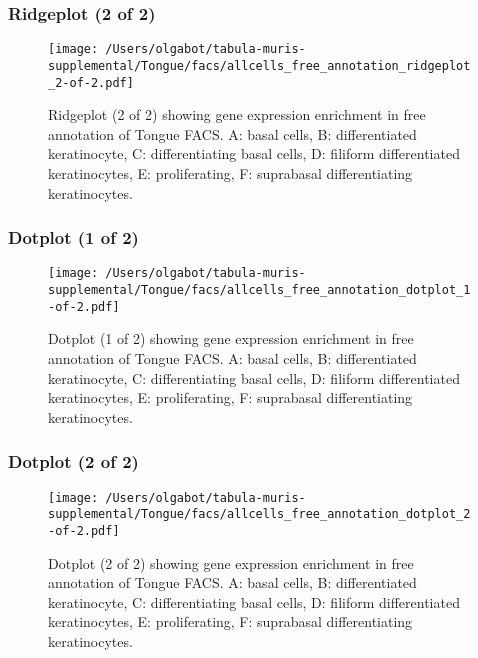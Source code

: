\clearpage
\clearpage
\subsubsection{Ridgeplot (2 of 2)}
\begin{figure}[h]
\centering
\texttt{[image: /Users/olgabot/tabula-muris-supplemental/Tongue/facs/allcells\_free\_annotation\_ridgeplot\_2-of-2.pdf]}

\caption{ Ridgeplot (2 of 2)  showing gene expression enrichment in free annotation of Tongue FACS. A: basal cells, B: differentiated keratinocyte, C: differentiating basal cells, D: filiform differentiated keratinocytes, E: proliferating, F: suprabasal differentiating keratinocytes.}
\end{figure}


\clearpage
\clearpage
\subsubsection{Dotplot (1 of 2)}
\begin{figure}[h]
\centering
\texttt{[image: /Users/olgabot/tabula-muris-supplemental/Tongue/facs/allcells\_free\_annotation\_dotplot\_1-of-2.pdf]}

\caption{ Dotplot (1 of 2)  showing gene expression enrichment in free annotation of Tongue FACS. A: basal cells, B: differentiated keratinocyte, C: differentiating basal cells, D: filiform differentiated keratinocytes, E: proliferating, F: suprabasal differentiating keratinocytes.}
\end{figure}


\clearpage
\clearpage
\subsubsection{Dotplot (2 of 2)}
\begin{figure}[h]
\centering
\texttt{[image: /Users/olgabot/tabula-muris-supplemental/Tongue/facs/allcells\_free\_annotation\_dotplot\_2-of-2.pdf]}

\caption{ Dotplot (2 of 2)  showing gene expression enrichment in free annotation of Tongue FACS. A: basal cells, B: differentiated keratinocyte, C: differentiating basal cells, D: filiform differentiated keratinocytes, E: proliferating, F: suprabasal differentiating keratinocytes.}
\end{figure}

